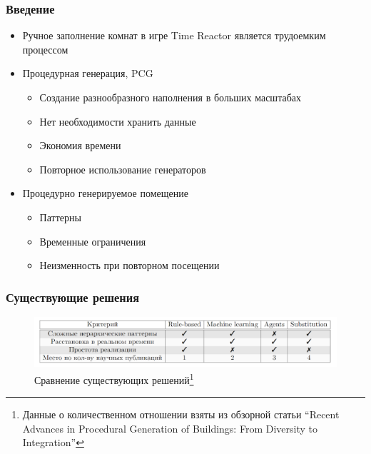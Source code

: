 \documentclass{beamer}
\begin{document}
\begin{frame}[fragile]  
  \frametitle{Введение}
  \begin{itemize}
    \item Ручное заполнение комнат в игре Time Reactor является трудоемким процессом
    \item Процедурная генерация, PCG
    \begin{itemize}
        \item Создание разнообразного наполнения в больших масштабах
        \item Нет необходимости хранить данные
        \item Экономия времени
        \item Повторное использование генераторов
    \end{itemize}
    \item Процедурно генерируемое помещение
    \begin{itemize}
        \item Паттерны
        \item Временные ограничения
        \item Неизменность при повторном посещении
    \end{itemize}
  \end{itemize}
\end{frame}
            
\begin{frame}  
  \frametitle{Существующие решения}
  \begin{center}
        \begin{figure}
            \centering
            \includegraphics[width=1.0\textwidth]{pictures/comparison_table.png}
            \caption{Сравнение существующих решений\footnote{Данные о количественном отношении взяты из обзорной статьи \enquote{Recent Advances in Procedural Generation of Buildings: From Diversity to Integration}}}
        \end{figure}
  \end{center}
\end{frame}
            
\end{document}
